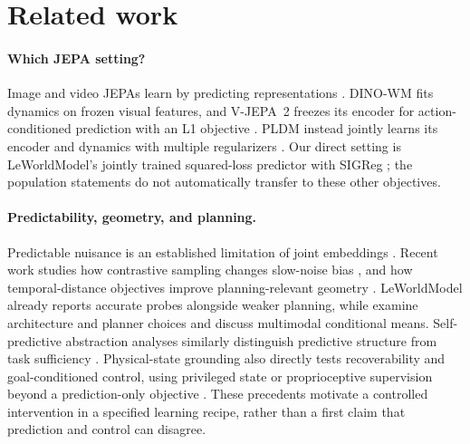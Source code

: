 \section{Related work}
\label{sec:related}

\paragraph{Which JEPA setting?}
Image and video JEPAs learn by predicting representations
\citep{assran2023ijepa,bardes2024vjepa}. DINO-WM fits dynamics on frozen visual features, and V-JEPA~2
freezes its encoder for action-conditioned prediction with an L1 objective
\citep{zhou2024dinowm,assran2025vjepa2}. PLDM instead jointly learns its encoder and dynamics with
multiple regularizers \citep{sobal2025pldm}. Our direct setting is LeWorldModel's jointly trained
squared-loss predictor with SIGReg \citep{maes2026lewm,balestriero2025lejepa}; the population statements
do not automatically transfer to these other objectives.

\paragraph{Predictability, geometry, and planning.}
Predictable nuisance is an established limitation of joint embeddings \citep{sobal2022slow}.
Recent work studies how contrastive sampling changes slow-noise bias
\citep{gulati2026contrast}, and how temporal-distance objectives improve planning-relevant geometry
\citep{bai2026temporal}. LeWorldModel already reports accurate probes alongside weaker planning,
while \citet{terver2026planning} examine architecture and planner choices and discuss multimodal
conditional means. Self-predictive abstraction analyses similarly distinguish predictive structure
from task sufficiency \citep{tang2023selfpredictive,ni2024bridging}. Physical-state grounding also directly tests recoverability and goal-conditioned control, using
privileged state or proprioceptive supervision beyond a prediction-only objective
\citep{yan2026psgjepa,liu2026physicallygrounded}. These precedents motivate a controlled intervention
in a specified learning recipe, rather than a first claim that prediction and control can disagree.


